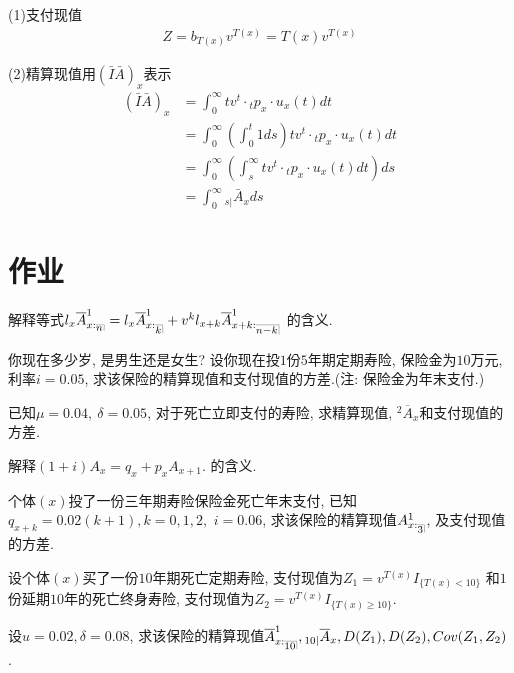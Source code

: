 \documentclass[a4paper,10pt]{ctexbook}
\makeatletter
\DeclareRobustCommand{\annu}[1]{_{%
    \def\arraystretch{0}%
    \setlength\arraycolsep{1pt}%
    \setlength\arrayrulewidth{.2pt}%
    \begin{array}[b]{@{}c|}\hline
        \\[\arraycolsep]%
        \scriptstyle #1%
    \end{array}%
}}
\makeatother
\begin{document}
(1)支付现值
\begin{align*}
    Z=b_{T(x)}v^{T(x)}=T(x)v^{T(x)}
\end{align*}

(2)精算现值用$\left( \bar{I}\bar{A} \right) _x$表示
\begin{align*}
    \left( \bar{I}\bar{A} \right) _x & =\int_0^{\infty}t v^t\cdot {}_tp_x\cdot u_x(t)dt                    \\
                                     & =\int_0^{\infty }(\int_0^t1ds)t v^t\cdot {}_tp_x\cdot u_x(t)dt      \\
                                     & =\int_0^{\infty}(\int_s^{\infty}t v^t\cdot {}_tp_x\cdot u_x(t)dt)ds \\
                                     & =\int_0^{\infty} {}_{s|}\bar{A}_x ds
\end{align*}
\section{作业}
\begin{exs}
    解释等式$l_x\overline{A}_{x:\annu{n}}^1=l_x\overline{A}_{x:\annu{k}}^1+v^kl_{x+k}\overline{A}_{x+k:\annu{n-k}}^1$ 的含义.
\end{exs}

\begin{exs}
    你现在多少岁, 是男生还是女生? 设你现在投$1$份$5$年期定期寿险, 保险金为$10$万元, 利率$i = 0.05$, 求该保险的精算现值和支付现值的方差.(注: 保险金为年末支付.)
\end{exs}

\begin{exs}
    已知$\mu = 0.04, ~\delta = 0.05$, 对于死亡立即支付的寿险, 求精算现值, ${}^2\overline{A}_x$和支付现值的方差.
\end{exs}

\begin{exs}
    解释$(1+i){A}_x = q_x + p_x {A}_{x+1}. $ 的含义.
\end{exs}

\begin{exs}
    个体$(x)$投了一份三年期寿险保险金死亡年末支付, 已知$q_{x+k}=0.02(k+1),k=0,1,2, $ $i=0.06$, 求该保险的精算现值${A}_{x:\annu{3}}^1$, 及支付现值的方差.
\end{exs}

\begin{exs}
    设个体$(x)$买了一份$10$年期死亡定期寿险, 支付现值为$Z_1=v^{T(x)}I_{\{T(x)<10\}}$ 和$1$份延期$10$年的死亡终身寿险, 支付现值为$Z_2=v^{T(x)}I_{\{T(x)\ge 10\}}$.

    设$u=0.02, \delta=0.08$, 求该保险的精算现值$\overline {A}_{x:\annu{10}}^1, {}_{10|}\overline {A}_{x}, D(Z_1), D(Z_2), Cov(Z_1,Z_2)$.
\end{exs}
\end{document}
